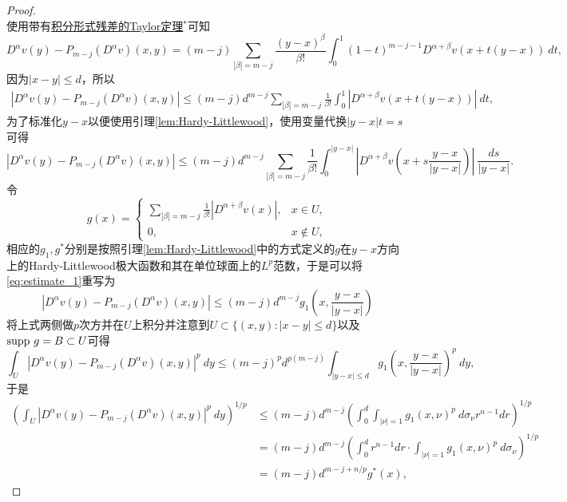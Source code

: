 \documentclass[a4paper,10pt]{ctexart}
\begin{document}
\begin{proof}
\begin{equation}
    \end{equation}
    使用带有\underline{积分形式残差的Taylor定理}$ ^* $可知
    \[
        D^\alpha v(y) - P_{m-j}(D^\alpha v)(x,y) = (m-j)\sum_{|\beta|=m-j} \frac{(y-x)^\beta}{\beta!} \int_0^1 (1-t)^{m-j-1} D^{\alpha+\beta} v(x+t(y-x))\ dt,
    \]
    因为$ |x-y| \leqslant d $，所以
    \[
        \begin{aligned}
            |D^\alpha v(y) - P_{m-j}(D^\alpha v)(x,y)| \leqslant (m-j)d^{m-j} \sum_{|\beta|=m-j} \frac{1}{\beta!} \int_0^1 |D^{\alpha+\beta} v(x+t(y-x))|\ dt,
        \end{aligned}
    \]
    为了标准化$ y-x $以便使用引理\ref{lem:Hardy-Littlewood}，使用变量代换$ |y-x|t = s $可得
    \begin{equation}\label{eq:estimate_1}
        |D^\alpha v(y) - P_{m-j}(D^\alpha v)(x,y)| \leqslant (m-j)d^{m-j} \sum_{|\beta|=m-j} \frac{1}{\beta!} \int_0^{|y-x|} |D^{\alpha+\beta} v(x+s\frac{y-x}{|y-x|})|\ \frac{ds}{|y-x|}.
    \end{equation}
    令
    \begin{equation}
        g(x) = 
        \begin{cases}
            \sum_{|\beta|=m-j}\frac{1}{\beta!} |D^{\alpha+\beta} v(x)|, & x\in U,\\
            0, & x\notin U,
        \end{cases}
    \end{equation}
    相应的$ g_1,g^* $分别是按照引理\ref{lem:Hardy-Littlewood}中的方式定义的$ g $在$ y-x $方向上的Hardy-Littlewood极大函数和其在单位球面上的$ L^p $范数，于是可以将\eqref{eq:estimate_1}重写为
    \[
        |D^\alpha v(y) - P_{m-j}(D^\alpha v)(x,y)| \leqslant (m-j)d^{m-j} g_1(x,\frac{y-x}{|y-x|})
    \]
    将上式两侧做$ p $次方并在$ U $上积分并注意到$ U\subset \{(x,y):|x-y|\leqslant d\} $以及$ {\rm supp}\ g = B\subset U $可得
    \[
        \int_U |D^\alpha v(y) - P_{m-j}(D^\alpha v)(x,y)|^p\ dy \leqslant (m-j)^p d^{p(m-j)} \int_{|y-x|\leqslant d} g_1(x,\frac{y-x}{|y-x|})^p\ dy,
    \]
    于是
    \[
        \begin{aligned}
            \left( \int_U |D^\alpha v(y) - P_{m-j}(D^\alpha v)(x,y)|^p\ dy \right) ^{1 / p} 
            &\leqslant (m-j) d^{m-j} \left( \int_0^d \int_{|\nu|=1} g_1(x,\nu)^p\ d \sigma_\nu r^{n-1}dr \right) ^{1 / p} \\
            &= (m-j) d^{m-j} \left( \int_0^dr^{n-1}dr\cdot \int_{|\nu|=1} g_1(x,\nu)^p\ d \sigma_\nu  \right) ^{1 / p}\\
            &= (m-j) d^{m-j+n / p} g^*(x),
        \end{aligned}
\]
\end{proof}
\end{document}

